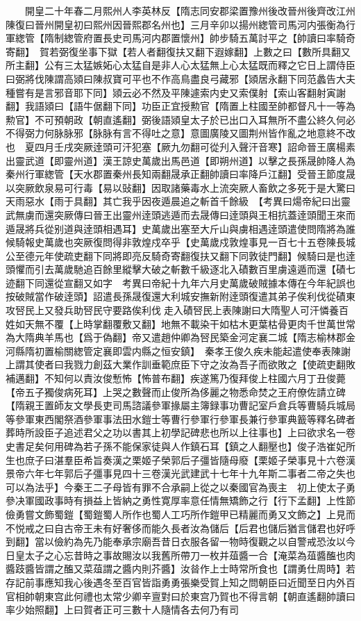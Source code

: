 　　開皇二十年春二月熙州人李英林反【隋志同安郡梁置豫州後改晉州後齊改江州陳復曰晉州開皇初曰熙州因晉熙郡名州也】三月辛卯以揚州緫管司馬河内張衡為行軍緫管【隋制緫管府置長史司馬河内郡置懷州】帥步騎五萬討平之【帥讀曰率騎奇寄翻】　賀若弼復坐事下獄【若人者翻復扶又翻下遐嫁翻】上數之曰【數所具翻又所主翻】公有三太猛嫉妬心太猛自是非人心太猛無上心太猛既而釋之它日上謂侍臣曰弼將伐陳謂高熲曰陳叔寶可平也不作高鳥盡良弓藏邪【熲居永翻下同范蠡告大夫種嘗有是言邪音耶下同】熲云必不然及平陳遽索内史又索僕射【索山客翻射寅謝翻】我語熲曰【語牛倨翻下同】功臣正宜授勲官【隋置上柱國至帥都督凡十一等為勲官】不可預朝政【朝直遙翻】弼後語熲皇太子於已出口入耳無所不盡公終久何必不得弼力何脉脉邪【脉脉有言不得吐之意】意圖廣陵又圖荆州皆作亂之地意終不改也　夏四月壬戌突厥逹頭可汗犯塞【厥九勿翻可從刋入聲汗音寒】詔命晉王廣楊素出靈武道【即靈州道】漢王諒史萬歲出馬邑道【即朔州道】以擊之長孫晟帥降人為秦州行軍緫管【天水郡置秦州長知兩翻晟承正翻帥讀曰率降戶江翻】受晉王節度晟以突厥飲泉易可行毒【易以䜴翻】因取諸藥毒水上流突厥人畜飲之多死于是大驚曰天雨惡水【雨于具翻】其亡我乎因夜遁晨追之斬首千餘級　【考異曰煬帝紀曰出靈武無虜而還突厥傳曰晉王出靈州逹頭逃遁而去晟傳曰逹頭與王相抗蓋逹頭聞王來而遁晟將兵從别道與逹頭相遇耳】史萬歲出塞至大斤山與虜相遇逹頭遣使問隋將為誰候騎報史萬歲也突厥復問得非敦煌戍卒乎【史萬歲戍敦煌事見一百七十五卷陳長城公至德元年使疏吏翻下同將即亮反騎奇寄翻復扶又翻下同敦徒門翻】候騎曰是也逹頭懼而引去萬歲馳追百餘里縱擊大破之斬數千級逐北入磧數百里虜遠遁而還【磧七迹翻下同還從宣翻又如字　考異曰帝紀十九年六月史萬歲破賊據本傳在今年紀誤也按破賊當作破逹頭】詔遣長孫晟復還大利城安撫新附逹頭復遣其弟子俟利伐從磧東攻唘民上又發兵助唘民守要路俟利伐走入磧唘民上表陳謝曰大隋聖人可汗憐養百姓如天無不覆【上時掌翻覆敷又翻】地無不載染干如枯木更葉枯骨更肉千世萬世常為大隋典羊馬也【爲于偽翻】帝又遣趙仲卿為唘民築金河定襄二城【隋志榆林郡金河縣隋初置榆關緫管定襄即雲内縣之恒安鎮】　秦孝王俊久疾未能起遣使奉表陳謝上謂其使者曰我戮力創茲大業作訓垂範庶臣下守之汝為吾子而欲敗之【使疏吏翻敗補邁翻】不知何以責汝俊慙怖【怖普布翻】疾遂篤乃復拜俊上柱國六月丁丑俊薨【帝五子獨俊病死耳】上哭之數聲而止俊所為侈麗之物悉命焚之王府僚佐請立碑【隋親王置師友文學長吏司馬諮議參軍掾屬主簿録事功曹記室戶倉兵等曹騎兵城局等參軍東西閣祭酒參軍事法田水鎧士等曹行參軍行參軍長兼行參軍典籖等釋名碑者葬時所設臣子追述君父之功以書其上初學記碑悲也所以上往事也】上曰欲求名一卷史書足矣何用碑為若子孫不能保家徒與人作鎮石耳【鎮之人翻壓也】俊子浩崔妃所生也庶子曰湛羣臣希旨奏漢之栗姬子榮郭后子彊皆隨母廢【栗姬子榮事見十六卷漢景帝六年七年郭后子彊事見四十三卷漢光武建武十七年十九年斯二事者二帝之失也可以為法乎】今秦王二子母皆有罪不合承嗣上從之以秦國官為喪主　初上使太子勇參决軍國政事時有損益上皆納之勇性寛厚率意任情無矯飾之行【行下孟翻】上性節儉勇嘗文飾蜀鎧【蜀鎧蜀人所作也蜀人工巧所作鎧甲已精麗而勇又文飾之】上見而不悦戒之曰自古帝王未有好奢侈而能久長者汝為儲后【后君也儲后猶言儲君也好呼到翻】當以儉約為先乃能奉承宗廟吾昔日衣服各留一物時復觀之以自警戒恐汝以今日皇太子之心忘昔時之事故賜汝以我舊所帶刀一枚并葅醬一合【淹菜為葅醬醢也肉醬跂醬皆謂之醢又菜葅謂之醬内則芥醬】汝㫺作上士時常所食也【謂勇仕周時】若存記前事應知我心後遇冬至百官皆詣勇勇張樂受賀上知之問朝臣曰近聞至日内外百官相帥朝東宫此何禮也太常少卿辛亶對曰於東宫乃賀也不得言朝【朝直遙翻帥讀曰率少始照翻】上曰賀者正可三數十人隨情各去何乃有司